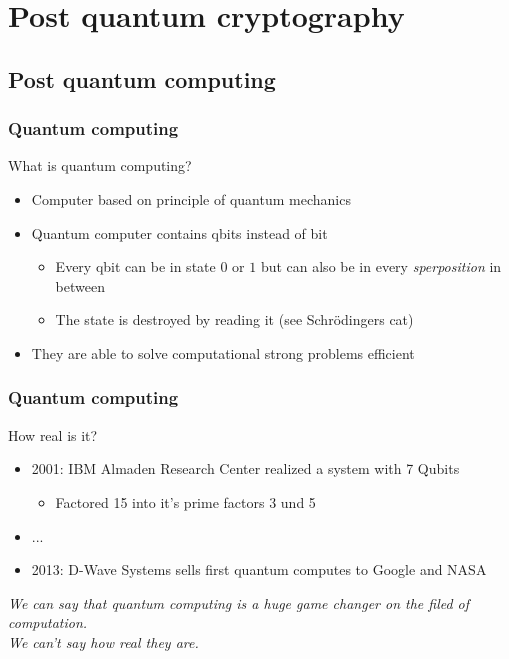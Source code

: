 \section[PQ Crypto]{Post quantum cryptography}
	\subsection{Post quantum computing}	
	
		\begin{frame}
			\frametitle{Quantum computing}
				 What is quantum computing?
				\begin{itemize}
					\item Computer based on principle of quantum mechanics
					\item Quantum computer contains qbits instead of bit
					\begin{itemize}
						\item Every qbit can be in state $0$ or $1$ but can also be in every \textit{sperposition} in between
						\item The state is destroyed by reading it (see Schrödingers cat)
					\end{itemize}
					\item They are able to solve computational strong problems efficient
				\end{itemize}
		\end{frame}
		
		\begin{frame}
			\frametitle{Quantum computing}
				How real is it?
				\begin{itemize}
					\item 2001: IBM Almaden Research Center realized a system with 7 Qubits 
					\begin{itemize}
						\item Factored 15 into it's prime factors 3 und 5
					\end{itemize}
					\item ...
					\item 2013: D-Wave Systems sells first quantum computes to Google and NASA
				\end{itemize}
				\vspace{10pt}
				\begin{block}{}
					\begin{center}
						\textit{
							We can say that quantum computing is a huge game changer on the filed of computation. \\
							We can't say how real they are.}
					\end{center}
				\end{block}
		\end{frame}
		
